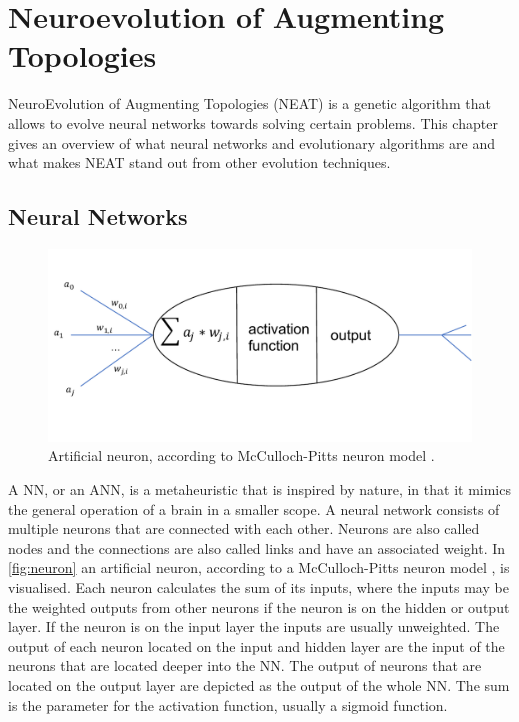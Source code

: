 \chapter{Neuroevolution of Augmenting Topologies}\label{ch:neatworking}
\glsresetall %
NeuroEvolution of Augmenting Topologies (NEAT) \cite{neat} is a genetic algorithm that allows to evolve neural networks towards solving certain problems. This chapter gives an overview of what neural networks and evolutionary algorithms are and what makes NEAT stand out from other evolution techniques. 
\section{Neural Networks}\label{sec:nn}
\begin{figure}[h]
	\center
	\includegraphics[width=1\linewidth]{neuron}
	\caption{Artificial neuron, according to McCulloch-Pitts neuron model \cite{McCulloch}.}
	\label{fig:neuron}
\end{figure}
A \gls{NN}, or an \gls{ANN}, is a metaheuristic that is inspired by nature, in that it mimics the general operation of a brain in a smaller scope. A neural network consists of multiple neurons that are connected with each other. Neurons are also called nodes and the connections are also called links and have an associated weight. In \autoref{fig:neuron} an artificial neuron, according to a McCulloch-Pitts neuron model \cite{McCulloch}, is visualised. Each neuron calculates the sum of its inputs, where the inputs may be the weighted outputs from other neurons if the neuron is on the hidden or output layer. If the neuron is on the input layer the inputs are usually unweighted. The output of each neuron located on the input and hidden layer are the input of the neurons that are located deeper into the NN. The output of neurons that are located on the output layer are depicted as the output of the whole NN.  The sum is the parameter for the activation function, usually a sigmoid function. \\
